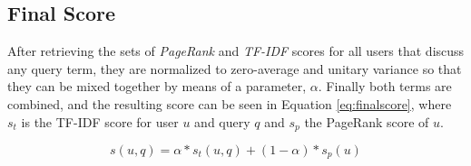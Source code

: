 \subsection{Final Score}

After retrieving the sets of \emph{PageRank} and \emph{TF-IDF} scores 
for all users that discuss any query term, they are normalized to zero-average 
and unitary variance so that they can be mixed together by means of a parameter, $\alpha$. 
Finally both terms are combined, and the resulting score can be seen in Equation \ref{eq:finalscore}, where $s_t$ is the TF-IDF score for user $u$ and query $q$ and $s_p$ the PageRank score of $u$.

\begin{equation}
s(u,q) = \alpha * s_t(u,q) + (1 - \alpha) * s_p(u)
\label{eq:finalscore}
\end{equation}